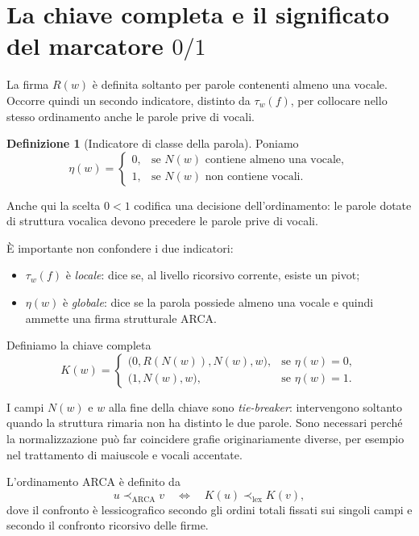 \documentclass[11pt,a4paper]{article}
\theoremstyle{definition}
\newtheorem{definizione}[teorema]{Definizione}
\theoremstyle{remark}
\newcommand{\ARCA}{\mathrm{ARCA}}
\newcommand{\precA}{\prec_{\ARCA}}
\newcommand{\lexord}{\prec_{\mathrm{lex}}}
\newcommand{\Nrm}{N}
\newcommand{\Sig}{R}
\newcommand{\Tag}{\tau_w}
\newcommand{\Class}{\eta}
\begin{document}
\section{La chiave completa e il significato del marcatore $0/1$}

La firma $\Sig(w)$ è definita soltanto per parole contenenti almeno una vocale. Occorre quindi un secondo indicatore, distinto da $\Tag(f)$, per collocare nello stesso ordinamento anche le parole prive di vocali.

\begin{definizione}[Indicatore di classe della parola]
Poniamo
\[
  \Class(w)=
  \begin{cases}
    0, & \text{se }\Nrm(w)\text{ contiene almeno una vocale},\\
    1, & \text{se }\Nrm(w)\text{ non contiene vocali}.
  \end{cases}
\]
\end{definizione}

Anche qui la scelta $0<1$ codifica una decisione dell'ordinamento: le parole dotate di struttura vocalica devono precedere le parole prive di vocali.

È importante non confondere i due indicatori:
\begin{itemize}
  \item $\Tag(f)$ è \emph{locale}: dice se, al livello ricorsivo corrente, esiste un pivot;
  \item $\Class(w)$ è \emph{globale}: dice se la parola possiede almeno una vocale e quindi ammette una firma strutturale ARCA.
\end{itemize}

Definiamo la chiave completa
\[
  K(w)=
  \begin{cases}
    \bigl(0,\Sig(\Nrm(w)),\Nrm(w),w\bigr),
      & \text{se }\Class(w)=0,\\[0.4em]
    \bigl(1,\Nrm(w),w\bigr),
      & \text{se }\Class(w)=1.
  \end{cases}
\]

I campi $\Nrm(w)$ e $w$ alla fine della chiave sono \emph{tie-breaker}: intervengono soltanto quando la struttura rimaria non ha distinto le due parole. Sono necessari perché la normalizzazione può far coincidere grafie originariamente diverse, per esempio nel trattamento di maiuscole e vocali accentate.

L'ordinamento ARCA è definito da
\[
  u\precA v
  \quad\Longleftrightarrow\quad
  K(u)\lexord K(v),
\]
dove il confronto è lessicografico secondo gli ordini totali fissati sui singoli campi e secondo il confronto ricorsivo delle firme.
\end{document}
